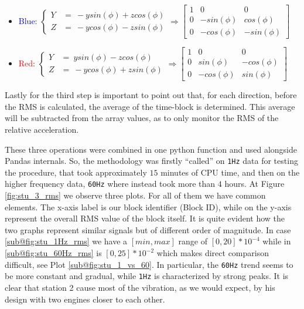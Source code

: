 \begin{itemize}
    \item \textcolor{blue}{Blue}: \( \left\{ 
        \begin{array}{cl} 
            Y & = \ -y sin(\phi) + z cos(\phi) \\
            Z & = \ -y cos(\phi) - z sin(\phi) 
        \end{array} \right. 
        \Rightarrow  
        \begin{bmatrix}
            1 & 0 & 0 \\
            0 & -sin(\phi) & cos(\phi)  \\
            0 & -cos(\phi) & -sin(\phi)  
        \end{bmatrix} \)
    \item \textcolor{red}{Red}: \( \left\{ 
        \begin{array}{cl}
            Y & = \ y sin(\phi) - z cos(\phi) \\
            Z & = \ -y cos(\phi) + z sin(\phi) 
        \end{array} \right. 
        \Rightarrow
        \begin{bmatrix}
            1 & 0 & 0 \\
            0 & sin(\phi) & -cos(\phi)  \\
            0 & -cos(\phi) & sin(\phi)  
        \end{bmatrix} \)
\end{itemize}
Lastly for the third step is important to point out that, for each direction, before the RMS is calculated, the average of the time-block is determined. 
This average will be subtracted from the array values, as to only monitor the RMS of the relative acceleration.

These three operations were combined in one python function and used alongside Pandas internals. So, the methodology was firstly ``called'' on \texttt{1Hz} data for testing the procedure, that took approximately $15$ minutes of CPU time, 
and then on the higher frequency data, \texttt{60Hz} where instead took more than $4$ hours. At Figure \ref{fig:stu_3_rms} we observe three plots.
For all of them we have common elements. The x-axis label is our block identifier (Block ID), while on the y-axis represent the overall RMS value of the block itself. 
It is quite evident how the two graphs represent similar signals but of different order of magnitude. In case \ref{sub@fig:stu_1Hz_rms} we have a $[min, max]$ range of $[0,20] * 10^{-4}$ 
while in \ref{sub@fig:stu_60Hz_rms} is $[0,25] * 10^{-2}$ which makes direct comparison difficult, see Plot \ref{sub@fig:stu_1_vs_60}.
In particular, the \texttt{60Hz} trend seems to be more constant and gradual, while \texttt{1Hz} is characterized by strong peaks. It is clear that station 2 cause most of the vibration, 
as we would expect, by his design with two engines closer to each other.

